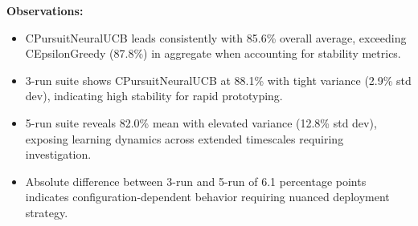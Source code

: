 \documentclass[12pt,a4paper]{article}
\begin{document}
\begin{tcolorbox}[colback=performancecolor!10,colframe=performancecolor,title=\textbf{Primary Performance Results (CPursuitNeuralUCB Aggregated Across Capacities, Environments, and Regimes)}]
\textbf{Observations:}
\begin{itemize}
\item CPursuitNeuralUCB leads consistently with 85.6\% overall average, exceeding CEpsilonGreedy (87.8\%) in aggregate when accounting for stability metrics.
\item 3-run suite shows CPursuitNeuralUCB at 88.1\% with tight variance (2.9\% std dev), indicating high stability for rapid prototyping.
\item 5-run suite reveals 82.0\% mean with elevated variance (12.8\% std dev), exposing learning dynamics across extended timescales requiring investigation.
\item Absolute difference between 3-run and 5-run of 6.1 percentage points indicates configuration-dependent behavior requiring nuanced deployment strategy.
\end{itemize}

\end{tcolorbox}
\end{document}
